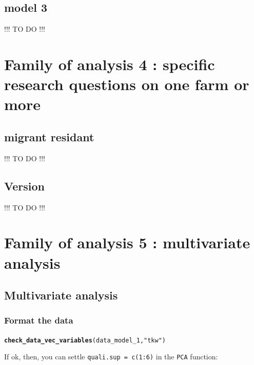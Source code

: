 \documentclass{book}\usepackage[]{graphicx}\usepackage[]{color}
\makeatletter
\newcommand{\hlstr}[1]{\textcolor[rgb]{0.192,0.494,0.8}{#1}}%
\newcommand{\hlstd}[1]{\textcolor[rgb]{0.345,0.345,0.345}{#1}}%
\newcommand{\hlkwd}[1]{\textcolor[rgb]{0.737,0.353,0.396}{\textbf{#1}}}%
\newenvironment{kframe}{%
 \def\at@end@of@kframe{}%
 \ifinner\ifhmode%
  \def\at@end@of@kframe{\end{minipage}}%
  \begin{minipage}{\columnwidth}%
 \fi\fi%
 \def\FrameCommand##1{\hskip\@totalleftmargin \hskip-\fboxsep
 \colorbox{shadecolor}{##1}\hskip-\fboxsep
     \hskip-\linewidth \hskip-\@totalleftmargin \hskip\columnwidth}%
 \MakeFramed {\advance\hsize-\width
   \@totalleftmargin\z@ \linewidth\hsize
   \@setminipage}}%
 {\par\unskip\endMakeFramed%
 \at@end@of@kframe}
\newenvironment{knitrout}{}{} %
\makeatother
\begin{document}
\subsection{model 3 }
\label{model_3}

!!! TO DO !!!

\newpage

\section{Family of analysis 4 : specific research questions on one farm or more}


\subsection{migrant residant}
\label{migrant_residant}

!!! TO DO !!!

\newpage


\subsection{Version}
\label{version}


!!! TO DO !!!
\newpage

\section{Family of analysis 5 : multivariate analysis}

\subsection{Multivariate analysis}
\label{multivariate_analysis}

\subsubsection{Format the data}

\begin{knitrout}
\color{fgcolor}\begin{kframe}
\begin{alltt}
\hlkwd{check_data_vec_variables}\hlstd{(data_model_1,} \hlstr{"tkw"}\hlstd{)}
\end{alltt}
\end{kframe}
\end{knitrout}

If ok, then, you can settle \texttt{quali.sup = c(1:6)} in the \texttt{PCA} function:
\end{document}

